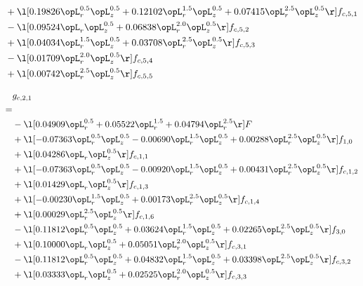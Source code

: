 \begin{alignat}{2}
& + \l[  0.19826 \opL_r^{0.5} \opL_z^{0.5} +  0.12102 \opL_r^{1.5} \opL_z^{0.5} +  0.07415 \opL_r^{2.5} \opL_z^{0.5}  \r] f_{c,5,1} \nonumber \\ 
& - \l[  0.09524 \opL_r \opL_z^{0.5} +  0.06838 \opL_r^{2.0} \opL_z^{0.5}  \r] f_{c,5,2} \nonumber \\ 
& + \l[  0.04034 \opL_r^{1.5} \opL_z^{0.5} +  0.03708 \opL_r^{2.5} \opL_z^{0.5}  \r] f_{c,5,3} \nonumber \\ 
& - \l[  0.01709 \opL_r^{2.0} \opL_z^{0.5}  \r] f_{c,5,4} \nonumber \\ 
& + \l[  0.00742 \opL_r^{2.5} \opL_z^{0.5}  \r] f_{c,5,5} \nonumber \\ 
\end{alignat} 


\begin{alignat}{2} 
\label{eq:g_21_0} 
& g_{c,2,1} \nonumber \\ 
 = \\ 
& - \l[  0.04909 \opL_r^{0.5} +  0.05522 \opL_r^{1.5} +  0.04794 \opL_r^{2.5}  \r] F \nonumber \\ 
& + \l[  -0.07363 \opL_r^{0.5} \opL_z^{0.5}   -0.00690 \opL_r^{1.5} \opL_z^{0.5} +  0.00288 \opL_r^{2.5} \opL_z^{0.5}  \r] f_{1,0} \nonumber \\ 
& + \l[  0.04286 \opL_r \opL_z^{0.5}  \r] f_{c,1,1} \nonumber \\ 
& + \l[  -0.07363 \opL_r^{0.5} \opL_z^{0.5}   -0.00920 \opL_r^{1.5} \opL_z^{0.5} +  0.00431 \opL_r^{2.5} \opL_z^{0.5}  \r] f_{c,1,2} \nonumber \\ 
& + \l[  0.01429 \opL_r \opL_z^{0.5}  \r] f_{c,1,3} \nonumber \\ 
& + \l[  -0.00230 \opL_r^{1.5} \opL_z^{0.5} +  0.00173 \opL_r^{2.5} \opL_z^{0.5}  \r] f_{c,1,4} \nonumber \\ 
& + \l[  0.00029 \opL_r^{2.5} \opL_z^{0.5}  \r] f_{c,1,6} \nonumber \\ 
& - \l[  0.11812 \opL_r^{0.5} \opL_z^{0.5} +  0.03624 \opL_r^{1.5} \opL_z^{0.5} +  0.02265 \opL_r^{2.5} \opL_z^{0.5}  \r] f_{3,0} \nonumber \\ 
& + \l[  0.10000 \opL_r \opL_z^{0.5} +  0.05051 \opL_r^{2.0} \opL_z^{0.5}  \r] f_{c,3,1} \nonumber \\ 
& - \l[  0.11812 \opL_r^{0.5} \opL_z^{0.5} +  0.04832 \opL_r^{1.5} \opL_z^{0.5} +  0.03398 \opL_r^{2.5} \opL_z^{0.5}  \r] f_{c,3,2} \nonumber \\ 
& + \l[  0.03333 \opL_r \opL_z^{0.5} +  0.02525 \opL_r^{2.0} \opL_z^{0.5}  \r] f_{c,3,3} \nonumber \\ 

\end{alignat}
